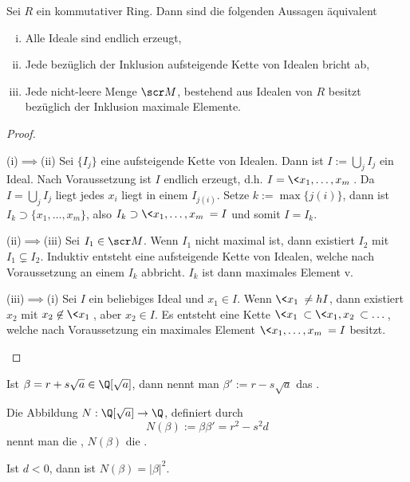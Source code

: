 
\begin{st} \label{4.6}
	Sei $R$ ein kommutativer Ring.
	Dann sind die folgenden Aussagen äquivalent
	\begin{enumerate}[(i)]
		\item
			Alle Ideale sind endlich erzeugt,
		\item
			Jede bezüglich der Inklusion aufsteigende Kette von Idealen bricht ab,
		\item
			Jede nicht-leere Menge $\scr M$, bestehend aus Idealen von $R$ besitzt bezüglich der Inklusion maximale Elemente.
	\end{enumerate}
	\begin{proof}
		\begin{seg}{(i)$\implies$(ii)}
			Sei $\{I_j\}$ eine aufsteigende Kette von Idealen.
			Dann ist $I := \bigcup_{j} I_j$ ein Ideal.
			Nach Voraussetzung ist $I$ endlich erzeugt, d.h. $I = \<x_1, \dotsc, x_m\>$.
			Da $I = \bigcup_j I_j$ liegt jedes $x_i$ liegt in einem $I_{j(i)}$.
			Setze $k := \max \{j(i)\}$, dann ist $I_k \supset \{x_1, \dotsc, x_m\}$, also $I_k \supset \<x_1, \dotsc, x_m\> = I$ und somit $I = I_k$.
		\end{seg}
		\begin{seg}{(ii)$\implies$(iii)}
			Sei $I_1 \in \scr M$.
			Wenn $I_1$ nicht maximal ist, dann existiert $I_2$ mit $I_1 \subsetneq I_2$.
			Induktiv entsteht eine aufsteigende Kette von Idealen, welche nach Voraussetzung an einem $I_k$ abbricht.
			$I_k$ ist dann maximales Element v.
		\end{seg}
		\begin{seg}{(iii)$\implies$(i)}
			Sei $I$ ein beliebiges Ideal und $x_1 \in I$.
			Wenn $\<x_1\> \neq hI$, dann existiert $x_2$ mit $x_2 \not\in \<x_1\>$, aber $x_2 \in I$.
			Es entsteht eine Kette $\<x_1\> \subset \<x_1, x_2\> \subset \dotsc$, welche nach Voraussetzung ein maximales Element $\<x_1, \dotsc, x_m\> = I$ besitzt.
		\end{seg}
	\end{proof}
\end{st}

\begin{df} \label{4.7}
	Ist $\beta = r + s\sqrt a \in \Q[\sqrt a]$, dann nennt man $\beta' := r - s\sqrt a$ das .

	Die Abbildung $N: \Q[\sqrt a] \to \Q$, definiert durch
	\[
		N(\beta) := \beta \beta' = r^2 - s^2 d
	\]
	nennt man die , $N(\beta)$ die .
	\begin{note}
		Ist $d < 0$, dann ist $N(\beta) = |\beta|^2$.
	\end{note}
\end{df}

